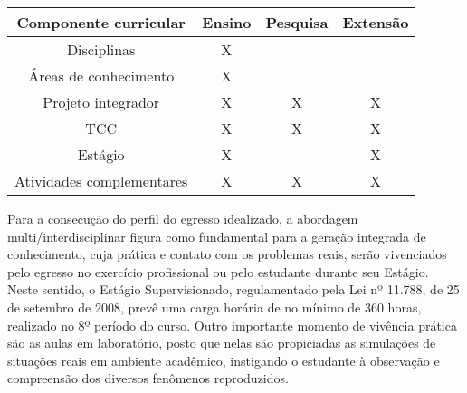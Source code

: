\begin{center}
\begin{tabular}{|c|c|c|c|} \hline
\textbf{Componente curricular} & \textbf{Ensino} & \textbf{Pesquisa} & \textbf{Extensão} \\ \hline
Disciplinas & X & &  \\ \hline
Áreas de conhecimento  & X & &  \\ \hline
Projeto integrador & X & X & X \\ \hline
TCC & X & X & X \\ \hline
Estágio & X & & X \\ \hline
\multicolumn{1}{|l|}{Atividades complementares} & X & X & X  \\ \hline

\hline
\end{tabular}
\end{center}




Para a consecução do perfil do egresso idealizado, a abordagem multi/interdisciplinar figura como fundamental para a geração integrada de conhecimento, cuja prática e contato com os problemas reais, serão vivenciados pelo egresso no exercício profissional ou pelo estudante durante seu Estágio. Neste sentido, o Estágio Supervisionado, regulamentado pela Lei nº 11.788, de 25 de setembro de 2008, prevê uma carga horária de no mínimo de 360 horas, realizado no 8º período do curso. 
Outro importante momento de vivência prática são as aulas em laboratório, posto que nelas são propiciadas as simulações de situações reais em ambiente acadêmico, instigando o estudante à observação e compreensão dos diversos fenômenos reproduzidos.

